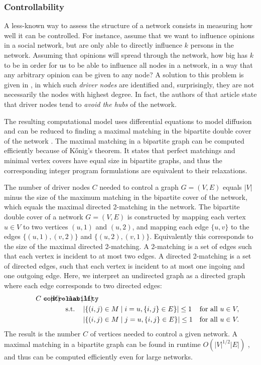 \documentclass{article}
\def\mathnote#1{%
  \tag*{\rlap{\hspace\marginparsep\smash{\parbox[t]{\marginparwidth}{#1}}}}
}
\begin{document}
\subsubsection{Controllability}
A less-known way to assess the structure of a network consists in
measuring how well it can be controlled.  For instance, assume that we
want to influence opinions in a social network, but are only able to
directly influence $k$ persons in the network. Assuming that opinions
will spread through the network, how big has $k$ to be in order for us
to be able to influence all nodes in a network, in a way that any
arbitrary opinion can be given to any node?  A solution to this problem
is given in \citep{b673}, in which such \emph{driver nodes} are
identified and, surprisingly, they are not necessarily the nodes with
highest degree.  In fact, the authors of that article state that driver
nodes tend to \emph{avoid the hubs} of the network. 

The resulting computational model uses differential equations to model
diffusion and can be reduced to finding a maximal matching in the
bipartite double cover of the network \citep{b673}. The maximal matching
in a bipartite graph can be computed efficiently because of Kőnig's
theorem. It states that perfect matchings and minimal vertex covers have
equal size in bipartite graphs, and thus the corresponding integer
program formulations are equivalent to their relaxations.

The number of driver nodes $C$ needed to control a graph $G=(V,E)$
equals $|V|$ minus the size of the maximum
matching in the bipartite cover of the network, which equals the
maximal directed 2-matching in the network.
The bipartite double cover of a network $G=(V,E)$ is constructed by
mapping each vertex $u\in V$ to two vertices $(u,1)$ and $(u,2)$, and
mapping each edge $\{u,v\}$ to the edges $\{(u,1),(v,2)\}$ and
$\{(u,2),(v,1)\}$.  Equivalently this corresponds
to the size of the maximal directed 2-matching.  A 2-matching is a set
of edges such that each vertex is incident to at most two edges.  A
directed 2-matching is a set of directed edges, such that each vertex is
incident to at most one ingoing and one outgoing edge.  Here, we
interpret an undirected graph as a directed graph where each edge
corresponds to two directed edges:
\begin{align*}
  \mathnote{\texttt{controllability}}
  C = |V| - & \max |M| \\
  & \text{s.t.} \quad \left| \left\{ (i,j) \in M \mid i = u, \{i,j\}\in E\right\} \right| \leq 1 
  & \text{for all } u \in V, \\
  & \phantom{\text{s.t.}} \quad \left| \left\{ (i,j) \in M \mid j = u, \{i,j\}\in E  \right\} \right| \leq 1
  & \text{for all } u \in V. 
\end{align*}
The result is the number $C$ of vertices needed to control a given
network.  
A maximal matching in a bipartite graph can be found in runtime
$O(|V|^{1/2}|E|)$ \citep{b673}, and thus can be computed efficiently even for large
networks. 
\end{document}
